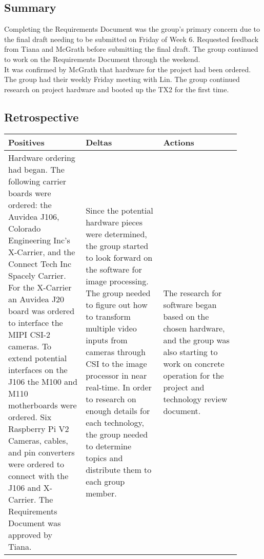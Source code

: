 \documentclass[letterpaper,10pt,serif,draftclsnofoot,onecolumn,compsoc,titlepage]{IEEEtran}
\begin{document}
\subsection{Summary}

Completing the Requirements Document was the group's primary concern due to the 
final draft needing to be submitted on Friday of Week 6. Requested feedback 
from Tiana and McGrath before submitting the final draft. The group continued to 
work on the Requirements Document through the weekend. \\

It was confirmed by McGrath that hardware for the project had been ordered. The group 
had their weekly Friday meeting with Lin. The group continued research on project hardware and booted up the TX2 for the first time.
\\

\subsection{Retrospective}

\begin{tabular}{|p{0.3\linewidth}|p{0.3\linewidth}|p{0.3\linewidth}|}
   \hline
   \textbf{Positives} & \textbf{Deltas} & \textbf{Actions}\\ 
   \hline
   Hardware ordering had began. The following carrier boards were ordered: the Auvidea 
   J106, Colorado Engineering Inc's X-Carrier, and the Connect Tech Inc Spacely Carrier. 
   For the X-Carrier an Auvidea J20 board was ordered to interface the MIPI CSI-2 
   cameras. To extend potential interfaces on the J106 the M100 and M110 motherboards 
   were ordered. Six Raspberry Pi V2 Cameras, cables, and pin converters were ordered 
   to connect with the J106 and X-Carrier. The Requirements Document was approved by 
   Tiana.
   & 
   Since the potential hardware pieces were determined, the group started to look forward 
   on the software for image processing. 
   The group needed to figure out how to transform multiple video inputs from cameras 
   through CSI to the image processor in near real-time. 
   In order to research on enough details for each technology, the group needed to determine 
   topics and distribute them to each group member.
   & 
   The research for software began based on the chosen hardware, and the group was also 
   starting to work on concrete operation for the project and technology review document. \\
   \hline
\end{tabular}
\end{document}
